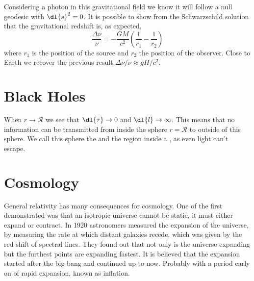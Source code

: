 \documentclass[fleqn]{NotesClass}
\begin{document}
    Considering a photon in this gravitational field we know it will follow a null geodesic with \(\dl{s}^2 = 0\).
    It is possible to show from the Schwarzschild solution that the gravitational redshift is, as expected,
    \begin{equation}
        \frac{\Delta\nu}{\nu} = -\frac{GM}{c^2} \left( \frac{1}{r_1} - \frac{1}{r_2} \right)
    \end{equation}
    where \(r_1\) is the position of the source and \(r_2\) the position of the observer.
    Close to Earth we recover the previous result \(\Delta\nu/\nu \approx gH/c^2\).
    
    \section{Black Holes}
    When \(r \to \mathcal{R}\) we see that \(\dl{\tau} \to 0\) and \(\dl{l} \to \infty\).
    This means that no information can be transmitted from inside the sphere \(r = \mathcal{R}\) to outside of this sphere.
    We call this sphere the  and the region inside a , as even light can't escape.
    
    \section{Cosmology}
    General relativity has many consequences for cosmology.
    One of the first demonstrated was that an isotropic universe cannot be static, it must either expand or contract.
    In 1920 astronomers measured the expansion of the universe, by measuring the rate at which distant galaxies recede, which was given by the red shift of spectral lines.
    They found out that not only is the universe expanding but the furthest points are expanding fastest.
    It is believed that the expansion started after the big bang and continued up to now.
    Probably with a period early on of rapid expansion, known as inflation.
    
\end{document}
